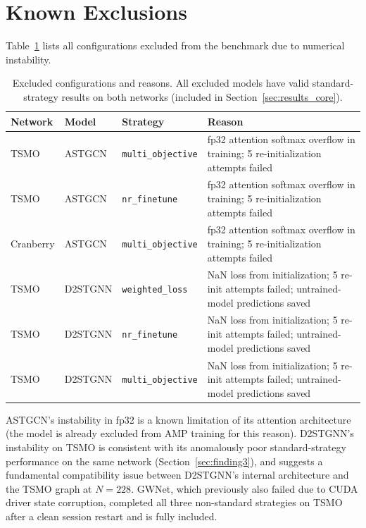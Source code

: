 \documentclass[a4paper]{cas-sc}
\begin{document}
\section{Known Exclusions}
\label{app:exclusions}

Table~\ref{tab:exclusions} lists all configurations excluded from the
benchmark due to numerical instability.

\begin{table}[h]
\centering
\caption{Excluded configurations and reasons.
         All excluded models have valid standard-strategy results
         on both networks (included in Section~\ref{sec:results_core}).}
\label{tab:exclusions}
\small
\begin{tabular}{lllp{6.5cm}}
\toprule
Network & Model & Strategy & Reason \\
\midrule
TSMO      & ASTGCN  & \texttt{multi\_objective} & fp32 attention softmax overflow in training; 5 re-initialization attempts failed \\
TSMO      & ASTGCN  & \texttt{nr\_finetune}     & fp32 attention softmax overflow in training; 5 re-initialization attempts failed \\
Cranberry & ASTGCN  & \texttt{multi\_objective} & fp32 attention softmax overflow in training; 5 re-initialization attempts failed \\
TSMO      & D2STGNN & \texttt{weighted\_loss}   & NaN loss from initialization; 5 re-init attempts failed; untrained-model predictions saved \\
TSMO      & D2STGNN & \texttt{nr\_finetune}     & NaN loss from initialization; 5 re-init attempts failed; untrained-model predictions saved \\
TSMO      & D2STGNN & \texttt{multi\_objective} & NaN loss from initialization; 5 re-init attempts failed; untrained-model predictions saved \\
\bottomrule
\end{tabular}
\end{table}

ASTGCN's instability in fp32 is a known limitation of its attention
architecture (the model is already excluded from AMP training for this
reason).
D2STGNN's instability on TSMO is consistent with its anomalously
poor standard-strategy performance on the same network
(Section~\ref{sec:finding3}), and suggests a fundamental
compatibility issue between D2STGNN's internal architecture and
the TSMO graph at $N{=}228$.
GWNet, which previously also failed due to CUDA driver state
corruption, completed all three non-standard strategies on TSMO
after a clean session restart and is fully included.
\end{document}
